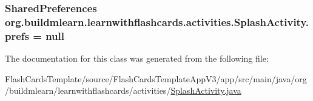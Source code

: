 \subsubsection[{\texorpdfstring{prefs}{prefs}}]{\setlength{\rightskip}{0pt plus 5cm}Shared\+Preferences org.\+buildmlearn.\+learnwithflashcards.\+activities.\+Splash\+Activity.\+prefs = null\hspace{0.3cm}{\ttfamily [private]}}\hypertarget{classorg_1_1buildmlearn_1_1learnwithflashcards_1_1activities_1_1SplashActivity_afa05a7d0030effbba7fad4c5564c8558}{}\label{classorg_1_1buildmlearn_1_1learnwithflashcards_1_1activities_1_1SplashActivity_afa05a7d0030effbba7fad4c5564c8558}


The documentation for this class was generated from the following file\+:\begin{DoxyCompactItemize}
\item 
Flash\+Cards\+Template/source/\+Flash\+Cards\+Template\+App\+V3/app/src/main/java/org/buildmlearn/learnwithflashcards/activities/\hyperlink{FlashCardsTemplate_2source_2FlashCardsTemplateAppV3_2app_2src_2main_2java_2org_2buildmlearn_2leac158be61e5aedf6ffe06f9a79f14f075}{Splash\+Activity.\+java}\end{DoxyCompactItemize}
